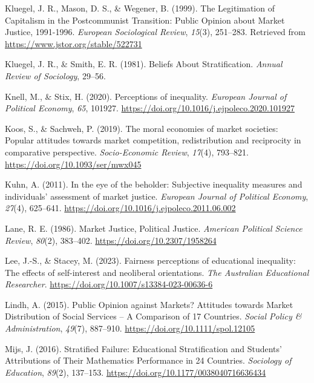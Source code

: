 \documentclass[
  12pt,
]{article}
\newlength{\cslhangindent}
\newenvironment{CSLReferences}[2] %
 {\begin{list}{}{%
  \setlength{\itemindent}{0pt}
  \setlength{\leftmargin}{0pt}
  \setlength{\parsep}{0pt}
  \ifodd #1
   \setlength{\leftmargin}{\cslhangindent}
   \setlength{\itemindent}{-1\cslhangindent}
  \fi
  \setlength{\itemsep}{#2\baselineskip}}}
 {\end{list}}
\begin{document}
\begin{CSLReferences}{1}{0}
Kluegel, J. R., Mason, D. S., \& Wegener, B. (1999). The {Legitimation}
of {Capitalism} in the {Postcommunist Transition}: {Public Opinion}
about {Market Justice}, 1991-1996. \emph{European Sociological Review},
\emph{15}(3), 251--283. Retrieved from
\url{https://www.jstor.org/stable/522731}

Kluegel, J. R., \& Smith, E. R. (1981). Beliefs {About Stratification}.
\emph{Annual Review of Sociology}, 29--56.

Knell, M., \& Stix, H. (2020). Perceptions of inequality. \emph{European
Journal of Political Economy}, \emph{65}, 101927.
\url{https://doi.org/10.1016/j.ejpoleco.2020.101927}

Koos, S., \& Sachweh, P. (2019). The moral economies of market
societies: Popular attitudes towards market competition, redistribution
and reciprocity in comparative perspective. \emph{Socio-Economic
Review}, \emph{17}(4), 793--821.
\url{https://doi.org/10.1093/ser/mwx045}

Kuhn, A. (2011). In the eye of the beholder: {Subjective} inequality
measures and individuals' assessment of market justice. \emph{European
Journal of Political Economy}, \emph{27}(4), 625--641.
\url{https://doi.org/10.1016/j.ejpoleco.2011.06.002}

Lane, R. E. (1986). Market {Justice}, {Political Justice}.
\emph{American Political Science Review}, \emph{80}(2), 383--402.
\url{https://doi.org/10.2307/1958264}

Lee, J.-S., \& Stacey, M. (2023). Fairness perceptions of educational
inequality: The effects of self-interest and neoliberal orientations.
\emph{The Australian Educational Researcher}.
\url{https://doi.org/10.1007/s13384-023-00636-6}

Lindh, A. (2015). Public {Opinion} against {Markets}? {Attitudes}
towards {Market Distribution} of {Social Services} -- {A Comparison} of
17 {Countries}. \emph{Social Policy \& Administration}, \emph{49}(7),
887--910. \url{https://doi.org/10.1111/spol.12105}

Mijs, J. (2016). Stratified {Failure}: {Educational Stratification} and
{Students}' {Attributions} of {Their Mathematics Performance} in 24
{Countries}. \emph{Sociology of Education}, \emph{89}(2), 137--153.
\url{https://doi.org/10.1177/0038040716636434}


\end{CSLReferences}
\end{document}
